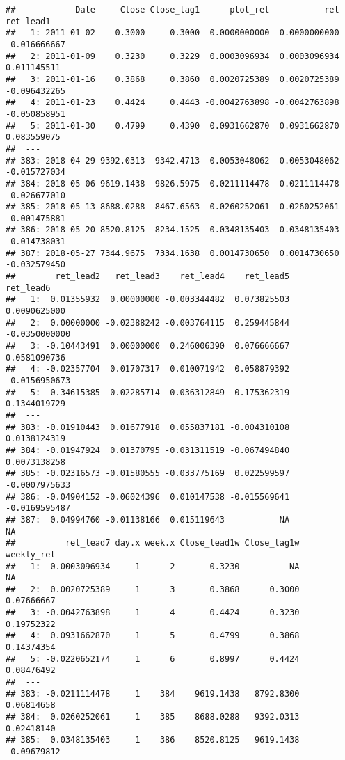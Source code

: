 \documentclass[
]{article}
\begin{document}
\begin{verbatim}
##            Date     Close Close_lag1      plot_ret           ret    ret_lead1
##   1: 2011-01-02    0.3000     0.3000  0.0000000000  0.0000000000 -0.016666667
##   2: 2011-01-09    0.3230     0.3229  0.0003096934  0.0003096934  0.011145511
##   3: 2011-01-16    0.3868     0.3860  0.0020725389  0.0020725389 -0.096432265
##   4: 2011-01-23    0.4424     0.4443 -0.0042763898 -0.0042763898 -0.050858951
##   5: 2011-01-30    0.4799     0.4390  0.0931662870  0.0931662870  0.083559075
##  ---                                                                         
## 383: 2018-04-29 9392.0313  9342.4713  0.0053048062  0.0053048062 -0.015727034
## 384: 2018-05-06 9619.1438  9826.5975 -0.0211114478 -0.0211114478 -0.026677010
## 385: 2018-05-13 8688.0288  8467.6563  0.0260252061  0.0260252061 -0.001475881
## 386: 2018-05-20 8520.8125  8234.1525  0.0348135403  0.0348135403 -0.014738031
## 387: 2018-05-27 7344.9675  7334.1638  0.0014730650  0.0014730650 -0.032579450
##        ret_lead2   ret_lead3    ret_lead4    ret_lead5     ret_lead6
##   1:  0.01355932  0.00000000 -0.003344482  0.073825503  0.0090625000
##   2:  0.00000000 -0.02388242 -0.003764115  0.259445844 -0.0350000000
##   3: -0.10443491  0.00000000  0.246006390  0.076666667  0.0581090736
##   4: -0.02357704  0.01707317  0.010071942  0.058879392 -0.0156950673
##   5:  0.34615385  0.02285714 -0.036312849  0.175362319  0.1344019729
##  ---                                                                
## 383: -0.01910443  0.01677918  0.055837181 -0.004310108  0.0138124319
## 384: -0.01947924  0.01370795 -0.031311519 -0.067494840  0.0073138258
## 385: -0.02316573 -0.01580555 -0.033775169  0.022599597 -0.0007975633
## 386: -0.04904152 -0.06024396  0.010147538 -0.015569641 -0.0169595487
## 387:  0.04994760 -0.01138166  0.015119643           NA            NA
##          ret_lead7 day.x week.x Close_lead1w Close_lag1w  weekly_ret
##   1:  0.0003096934     1      2       0.3230          NA          NA
##   2:  0.0020725389     1      3       0.3868      0.3000  0.07666667
##   3: -0.0042763898     1      4       0.4424      0.3230  0.19752322
##   4:  0.0931662870     1      5       0.4799      0.3868  0.14374354
##   5: -0.0220652174     1      6       0.8997      0.4424  0.08476492
##  ---                                                                
## 383: -0.0211114478     1    384    9619.1438   8792.8300  0.06814658
## 384:  0.0260252061     1    385    8688.0288   9392.0313  0.02418140
## 385:  0.0348135403     1    386    8520.8125   9619.1438 -0.09679812

\end{verbatim}
\end{document}
